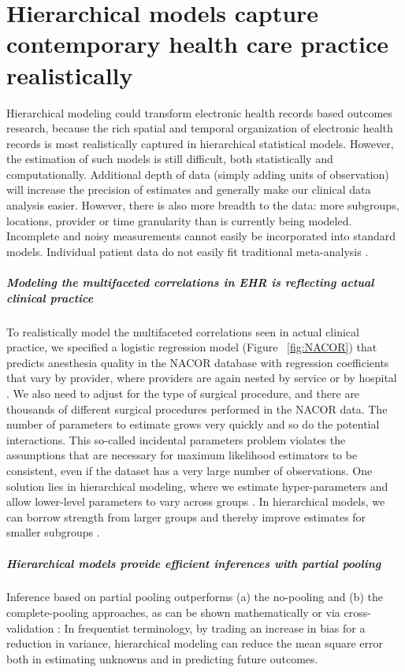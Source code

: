 \documentclass[11pt,notitlepage]{article}
\begin{document}
\section*{Hierarchical models capture contemporary health care practice realistically}
Hierarchical modeling could transform electronic health records based 
outcomes research, because the rich spatial and temporal 
organization of electronic health records is most realistically 
captured in hierarchical statistical models. However, the estimation of such models
is still difficult, both statistically and computationally.  
Additional depth of data (simply adding units of observation) will increase 
the precision of estimates and generally make our clinical data analysis easier. 
However, there is also more breadth to the data: 
more subgroups, locations, provider or time granularity than is currently 
being modeled. Incomplete and noisy measurements cannot easily be incorporated into standard models.
Individual patient data do not easily fit traditional meta-analysis
\cite{Andreae2015,Andreae2012}.

\subparagraph*{Modeling the multifaceted correlations in EHR is reflecting actual clinical practice}
To realistically model the multifaceted correlations seen in actual clinical 
practice, we specified a logistic regression model  (Figure~ \ref{fig:NACOR}) 
that predicts anesthesia quality in the NACOR database
with regression coefficients that vary by provider, where providers 
are again nested by service or by hospital 
\cite{AndreaeWhite2015}. We also need to adjust for the type of surgical procedure, and there are 
thousands of different surgical procedures performed in the NACOR data. The number 
of parameters to estimate grows very quickly and so do the potential interactions. This so-called
incidental parameters problem violates the assumptions that are necessary for maximum likelihood
estimators to be consistent, even if the dataset has a very large number of observations.
One solution lies in hierarchical modeling, where we estimate hyper-parameters and allow
lower-level parameters to vary across groups \cite{Bafumi_Gelman_2007}. 
In hierarchical models, we can borrow strength from larger groups and thereby improve estimates for 
smaller subgroups \cite{ParkGelman2004bayesian}.

\subparagraph*{Hierarchical models provide efficient inferences with partial pooling}
Inference based on partial pooling outperforms (a) the no-pooling and (b) the 
complete-pooling approaches, as can be shown mathematically \cite{Efron_1975} 
or via cross-validation \cite{Gelman-Hill_2014}: In frequentist terminology, by trading an increase in 
bias for a reduction in variance, hierarchical modeling can reduce the mean square error both
in estimating unknowns and in predicting future outcomes.
\end{document}
